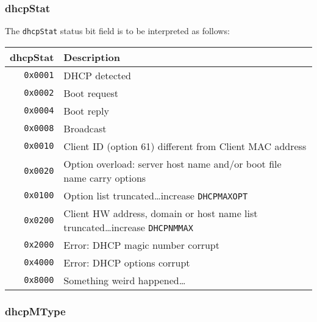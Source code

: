 \documentclass[documentation]{subfiles}
\begin{document}
\subsubsection{dhcpStat}\label{dhcpStat}
The {\tt dhcpStat} status bit field is to be interpreted as follows:
\begin{longtable}{rl}
    \toprule
    {\bf dhcpStat} & {\bf Description}\\
    \midrule\endhead%
    {\tt 0x0001} & DHCP detected \\
    {\tt 0x0002} & Boot request \\
    {\tt 0x0004} & Boot reply \\
    {\tt 0x0008} & Broadcast \\
    {\tt 0x0010} & Client ID (option 61) different from Client MAC address\\
    {\tt 0x0020} & Option overload: server host name and/or boot file name carry options\\
    {\tt 0x0100} & Option list truncated\ldots increase {\tt DHCPMAXOPT} \\
    {\tt 0x0200} & Client HW address, domain or host name list truncated\ldots increase {\tt DHCPNMMAX}\\
    {\tt 0x2000} & Error: DHCP magic number corrupt \\
    {\tt 0x4000} & Error: DHCP options corrupt \\
    {\tt 0x8000} & Something weird happened\ldots\\
    \bottomrule
\end{longtable}

\subsubsection{dhcpMType}\label{dhcpMType}
\end{document}
